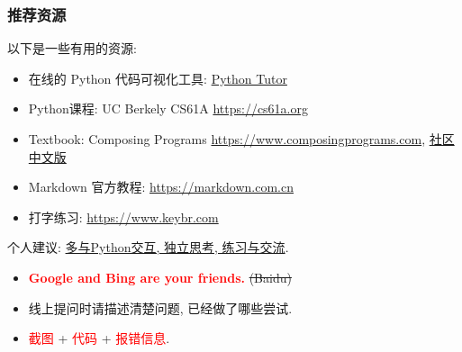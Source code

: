 \documentclass[handout]{ctexbeamer}
\begin{document}
        \begin{frame}
            \frametitle{推荐资源}   
            以下是一些有用的资源:
            \begin{itemize}
                \item 在线的 Python 代码可视化工具: \href{https://pythontutor.com/python-compiler.html}{Python Tutor}
                \item Python课程: UC Berkely CS61A \href{https://cs61a.org}{https://cs61a.org}
                \item Textbook: Composing Programs \href{https://www.composingprograms.com}{https://www.composingprograms.com}, \href{https://composingprograms.netlify.app}{社区中文版}            
                \item Markdown 官方教程: \href{https://markdown.com.cn}{https://markdown.com.cn}
                \item 打字练习: \href{https://www.keybr.com}{https://www.keybr.com}
            \end{itemize}
            \vspace{1em}
            个人建议: \underline{多与Python交互, 独立思考, 练习与交流}.

            \begin{itemize}
                \item \textcolor{red}{\textbf{Google and Bing are your friends.}} \sout{(Baidu)}
                \item 线上提问时请描述清楚问题, 已经做了哪些尝试. 
                \item \textcolor{red}{截图} + \textcolor{red}{代码} + \textcolor{red}{报错信息}.
            \end{itemize}
        \end{frame}
    
\end{document}
